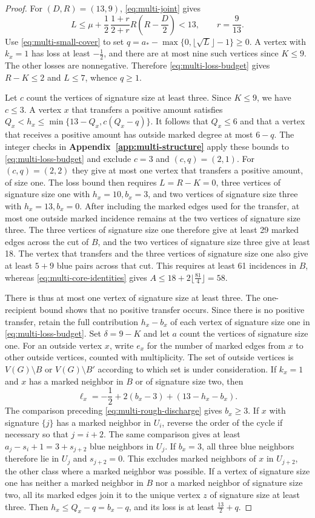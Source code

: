 \documentclass[preprint,11pt,numbers]{elsarticle-arxiv}
\numberwithin{equation}{section}
\theoremstyle{definition}
\begin{document}
\begin{proof}
For $(D,R)=(13,9)$, \eqref{eq:multi-joint} gives
\[
 L\le \mu+\frac{1}{2}\,\frac{1+r}{2+r}R(R-\frac{D}{2})<13,\qquad r=\frac{9}{13} .
\]
Use \eqref{eq:multi-small-cover} to set
$q=a_*-\max\{0,\lfloor\sqrt L\rfloor-1\}\ge0$.
A vertex with $k_x=1$ has loss at least $-\frac{1}{2}$, and
there are at most nine such vertices since $K\le9$. The other
losses are nonnegative. Therefore \eqref{eq:multi-loss-budget}
gives $R-K\le2$ and $L\le7$, whence $q\ge1$.

Let $c$ count the vertices of signature size at least three.
Since $K\le9$, we have $c\le3$. A vertex $x$ that transfers
a positive amount satisfies
$Q_x<h_x\le\min\{13-Q_x,c(Q_x-q)\}$.
It follows that $Q_x\le6$ and that a vertex that receives a
positive amount has outside marked degree at most $6-q$.
The integer checks in \textbf{Appendix~\ref{app:multi-structure}}
apply these bounds to \eqref{eq:multi-loss-budget} and exclude
$c=3$ and $(c,q)=(2,1)$. For $(c,q)=(2,2)$ they give at most
one vertex that transfers a positive amount, of size one.
The loss bound then requires $L=R-K=0$, three vertices of
signature size one with $h_x=10,b_x=3$, and two vertices
of signature size three with $h_x=13,b_x=0$.
After including the marked edges used for the transfer, at
most one outside marked incidence remains at the two vertices
of signature size three. The three vertices of signature size
one therefore give at least 29 marked edges across the cut of
$B$, and the two vertices of signature size three give at
least 18. The vertex that transfers and the three vertices
of signature size one also give at least $5+9$ blue pairs
across that cut. This requires at least 61 incidences in $B$,
whereas \eqref{eq:multi-core-identities} gives
$A\le18+2\lfloor\frac{81}{4}\rfloor=58$.

There is thus at most one vertex of signature size at least three.
The one-recipient bound shows that no positive transfer occurs.
Since there is no positive transfer, retain the full contribution
$h_x-b_x$ of each vertex of signature size one in
\eqref{eq:multi-loss-budget}. Set $\delta=9-K$ and let $a$ count
the vertices of signature size one. For an outside vertex $x$,
write $e_x$ for the number of marked edges from $x$ to other
outside vertices, counted with multiplicity. The set of outside
vertices is $V(G)\setminus B$ or $V(G)\setminus B'$ according to
which set is under consideration. If $k_x=1$ and $x$ has a marked
neighbor in $B$ or of signature size two, then
\[
 \ell_x=-\frac{1}{2}+2(b_x-3)+(13-h_x-b_x).
\]
The comparison preceding \eqref{eq:multi-rough-discharge} gives
$b_x\ge3$. If $x$ with signature $\{j\}$ has a marked neighbor
in $U_i$, reverse the order of the cycle if necessary so that
$j=i+2$. The same comparison gives at least
$a_j-s_i+1=3+s_{j+2}$ blue neighbors in $U_j$. If $b_x=3$, all
three blue neighbors therefore lie in $U_j$ and $s_{j+2}=0$.
This excludes marked neighbors of $x$ in $U_{j+2}$, the other
class where a marked neighbor was possible. If a vertex of
signature size one has neither a marked neighbor in $B$ nor a
marked neighbor of signature size two, all its marked edges
join it to the unique vertex $z$ of signature size at least
three. Then $h_x\le Q_x-q=b_x-q$, and its loss is at least
$\frac{13}{2}+q$.


\end{proof}
\end{document}
